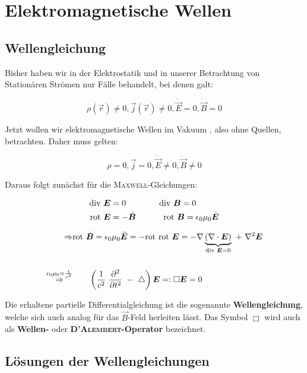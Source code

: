 \chapter{Elektromagnetische Wellen}

\section{Wellengleichung}

Bisher haben wir in der Elektrostatik und in unserer Betrachtung von Stationären Strömen nur Fälle behandelt, bei denen galt:

\begin{equation*}
\rho(\vec{r})\neq 0, \vec{j}(\vec{r})\neq 0, \dot{\vec{E}}=0, \dot{\vec{B}}=0
\end{equation*}

Jetzt wollen wir elektromagnetische Wellen im Vakuum , also ohne Quellen, betrachten. Daher muss gelten: 

\begin{equation*}
\rho=0, \vec{j}=0,\dot{\vec{E}}\neq 0,\dot{\vec{B}}\neq 0
\end{equation*}

Daraus folgt zunächst für die \textsc{Maxwell}-Gleichungen:

\begin{align*}
\text{div } \bm{E} &=0 \qquad \qquad\text{div } \bm{B} = 0\\
\text{rot }  \bm{E} &= -\dot{\bm{B}} \qquad\quad \ \text{rot } \bm{B} = \epsilon_0\mu_0 \dot{\bm{E}}\\
\end{align*}

\begin{align*}
\Rightarrow & \text{rot }\dot{\bm{B}} = \epsilon_0\mu_0\ddot{\bm{E}} = -\text{rot }\text{rot }\bm{E} = -\nabla\underbrace{(\nabla\cdot\bm{E})}_{\text{div }\bm{E}=0} \ + \ \nabla^2 \bm{E}\\
\ \\
\overset{\epsilon_0\mu_0 = \frac{1}{c^2}}{\Rightarrow} &\qquad \left(\frac{1}{c^2} \ \frac{\partial ^2{}}{\partial{t}^2} \ - \ \bigtriangleup\right)\bm{E} =: \Box\bm{E} = 0
\end{align*}

Die erhaltene partielle Differentialgleichung ist die sogenannte \textbf{Wellengleichung}, welche sich auch analog für das $\vec{B}$-Feld herleiten lässt. Das Symbol $\Box$ wird auch als \textbf{Wellen-} oder \textbf{\textsc{D'Alembert}-Operator} bezeichnet.


\section{Lösungen der Wellengleichungen}

